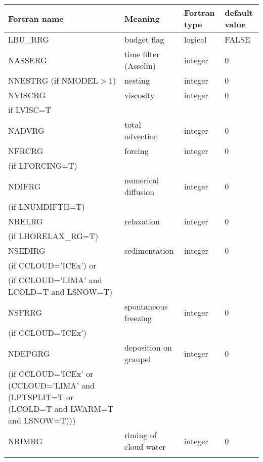 \begin{longtable} {|p{}|p{}|>{\centering}p{}|p{}<{\centering}|}
\hline
Fortran name & Meaning & Fortran type & default value \\
\hline \hline
\endhead
LBU\_RRG & budget flag & logical & FALSE\index{LBU\_RRG!\innam{NAM\_BU\_RRG}} \\\hline
NASSERG  & time filter (Asselin)   & integer  &  0 \index{NASSERG!\innam{NAM\_BU\_RRG}} \\\hline
NNESTRG (if NMODEL$>1$) & nesting           & integer  &  0 \index{NNESTRG!\innam{NAM\_BU\_RRG}} \\\hline
NVISCRG  & viscosity         & integer  &  0 \index{NVISCRG!\innam{NAM\_BU\_RRG}}\\
if LVISC=T &  &   &   \\\hline
NADVRG   & total advection   & integer  &  0 \index{NADVRG!\innam{NAM\_BU\_RRG}}\\\hline
NFRCRG   & forcing           & integer  &  0 \index{NFRCRG!\innam{NAM\_BU\_RRG}} \\ \nopagebreak
(if LFORCING=T) &  &   &   \\\hline
NDIFRG   & numerical diffusion & integer  &  0 \index{NDIFRG!\innam{NAM\_BU\_RRG}} \\ \nopagebreak
(if LNUMDIFTH=T) &  &   &   \\\hline
NRELRG   & relaxation        & integer  &  0 \index{NRELRG!\innam{NAM\_BU\_RRG}}\\ \nopagebreak
(if LHORELAX\_RG=T) &  &   &   \\\hline
NSEDIRG  & sedimentation     & integer  &  0 \index{NSEDIRG!\innam{NAM\_BU\_RRG}}\\ \nopagebreak
(if CCLOUD='ICEx') or & &   &  \\ \nopagebreak
(if CCLOUD='LIMA' and LCOLD=T and LSNOW=T) & &   &  \\\hline
NSFRRG  & spontaneous freezing & integer  &  0 \index{NSFRRG!\innam{NAM\_BU\_RRG}}\\ \nopagebreak
(if CCLOUD='ICEx') & &   &  \\\hline
NDEPGRG  & deposition on graupel & integer  &  0 \index{NDEPGRG!\innam{NAM\_BU\_RRG}}\\ \nopagebreak
(if CCLOUD='ICEx' or (CCLOUD='LIMA' and (LPTSPLIT=T or (LCOLD=T and LWARM=T and LSNOW=T))) & & & \\\hline
NRIMRG   & riming of cloud water & integer  &  0 \index{NRIMRG!\innam{NAM\_BU\_RRG}}\\ \nopagebreak

\end{longtable}
